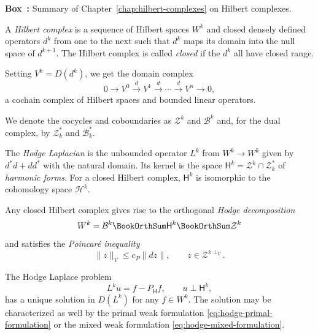 \begin{tcolorbox}[enhanced,breakable,colback=KuangNei,frame hidden,boxrule=0pt,sharpish corners,before skip=10pt,after skip=10pt]
\label{box:hilbert-complexes-summary}
\noindent\textbf{Box~\thebooksummary:} {Summary of Chapter~\ref{chap:hilbert-complexes} on Hilbert complexes.}\par

{A \emph{Hilbert complex} is a sequence of Hilbert spaces $W^k$ and closed densely defined operators $d^k$ from one to the next such that $d^k$ maps its domain into the null space of $d^{k+1}$. The Hilbert complex is called \emph{closed} if the $d^k$ all have closed range.}

{Setting $V^k=D(d^k)$, we get the domain complex}
\[
0\to V^0\xrightarrow{d}V^1\xrightarrow{d}\cdots\xrightarrow{d}V^n\to0,
\]
{a cochain complex of Hilbert spaces and bounded linear operators.}

{We denote the cocycles and coboundaries as $\mathcal Z^k$ and $\mathcal B^k$ and, for the dual complex, by $\mathcal Z_k^*$ and $\mathcal B_k^*$.}

{The \emph{Hodge Laplacian} is the unbounded operator $L^k$ from $W^k\to W^k$ given by $d^*d+dd^*$ with the natural domain. Its kernel is the space $\mathsf H^k=\mathcal Z^k\cap\mathcal Z_k^*$ of \emph{harmonic forms}. For a closed Hilbert complex, $\mathsf H^k$ is isomorphic to the cohomology space $\mathcal H^k$.}

{Any closed Hilbert complex gives rise to the orthogonal \emph{Hodge decomposition}}
\[
W^k=\mathcal B^k\BookOrthSum\mathsf H^k\BookOrthSum\mathcal Z^k
\]
{and satisfies the \emph{Poincaré inequality}}
\[
\|z\|_V\leq c_P\|dz\|,\qquad z\in\mathcal Z^{k\perp_V}.
\]

{The Hodge Laplace problem}
\[
L^ku=f-P_{\mathsf H}f,\qquad u\perp\mathsf H^k,
\]
{has a unique solution in $D(L^k)$ for any $f\in W^k$. The solution may be characterized as well by the primal weak formulation \eqref{eq:hodge-primal-formulation} or the mixed weak formulation \eqref{eq:hodge-mixed-formulation}.}
\end{tcolorbox}

